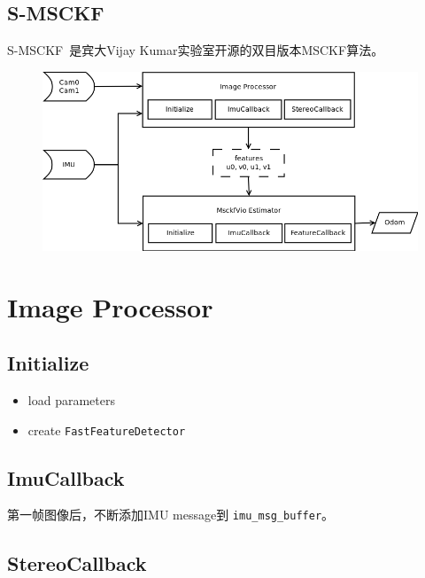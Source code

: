 \documentclass[12pt,a4paper]{article}
\begin{document}
\subsection{S-MSCKF}

S-MSCKF~\cite{sun2018robust}是宾大Vijay Kumar实验室开源的双目版本MSCKF算法。


\begin{figure}[!htbp]
\centering
\includegraphics[scale=0.5]{images/msckf_vio_io.png}
\end{figure}

\newpage
\section{Image Processor}

\subsection{Initialize}

\begin{itemize}
\item load parameters
\item create \verb|FastFeatureDetector|
\end{itemize}

\subsection{ImuCallback}

第一帧图像后，不断添加IMU message到 \verb|imu_msg_buffer|。

\subsection{StereoCallback}
\end{document}
